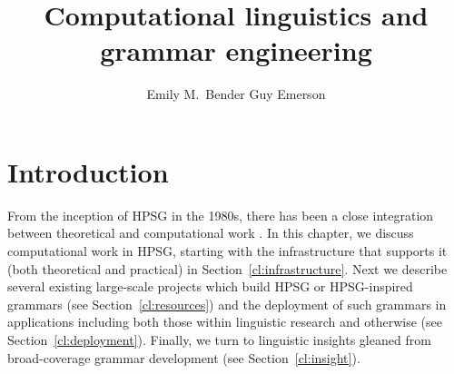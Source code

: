 \documentclass[output=paper]{langsci/langscibook}
\author{%
	Emily M.\ Bender\affiliation{University of Washington}%
	\lastand Guy Emerson\affiliation{University of Cambridge}
}
\title{Computational linguistics and grammar engineering}
\begin{document}
\maketitle

\label{chap-cl}



\section{Introduction}


From the inception of HPSG in the 1980s,
there has been a close integration between theoretical and computational work
.
In this chapter, we discuss computational work in HPSG,
starting with the infrastructure that supports it (both theoretical and practical) in Section~\ref{cl:infrastructure}.
Next we describe several existing large-scale projects which build HPSG or HPSG-inspired grammars
(see Section~\ref{cl:resources})
and the deployment of such grammars in applications including both those within linguistic research and otherwise
(see Section~\ref{cl:deployment}).
Finally, we turn to linguistic insights gleaned from broad-coverage grammar development
(see Section~\ref{cl:insight}).


\end{document}
